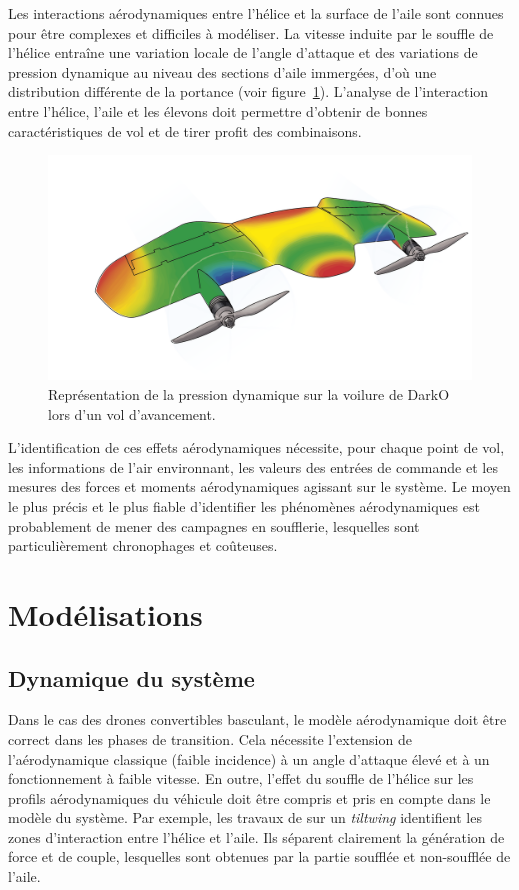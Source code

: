     Les interactions aérodynamiques entre l'hélice et la surface de l'aile sont connues pour être complexes et difficiles à modéliser. La vitesse induite par le souffle de l'hélice entraîne une variation locale de l'angle d'attaque et des variations de pression dynamique au niveau des sections d'aile immergées, d'où une distribution différente de la portance (voir figure~\ref{fig:darkoAirPress}). L'analyse de l'interaction entre l'hélice, l'aile et les élevons doit permettre d'obtenir de bonnes caractéristiques de vol et de tirer profit des combinaisons.

    \begin{figure}[ht!]
        \centering
            \includegraphics[width=0.6\columnwidth]{figures/Darko-air-pressure.png}
            \caption{Représentation de la pression dynamique sur la voilure de DarkO lors d'un vol d'avancement.}
            \label{fig:darkoAirPress}
    \end{figure}

     L'identification de ces effets aérodynamiques nécessite, pour chaque point de vol, les informations de l'air environnant, les valeurs des entrées de commande et les mesures des forces et moments aérodynamiques agissant sur le système. Le moyen le plus précis et le plus fiable d'identifier les phénomènes aérodynamiques est probablement de mener des campagnes en soufflerie, lesquelles sont particulièrement chronophages et coûteuses.


\section{Modélisations}

\subsection{Dynamique du système}
Dans le cas des drones convertibles basculant, le modèle aérodynamique doit être correct dans les phases de transition. Cela nécessite l'extension de l'aérodynamique classique (faible incidence) à un angle d'attaque élevé et à un fonctionnement à faible vitesse. En outre, l'effet du souffle de l'hélice sur les profils aérodynamiques du véhicule doit être compris et pris en compte dans le modèle du système. Par exemple, les travaux de \cite{9444145} sur un \textit{tiltwing} identifient les zones d'interaction entre l'hélice et l'aile. Ils séparent clairement la génération de force et de couple, lesquelles sont obtenues par la partie soufflée et non-soufflée de l'aile.

